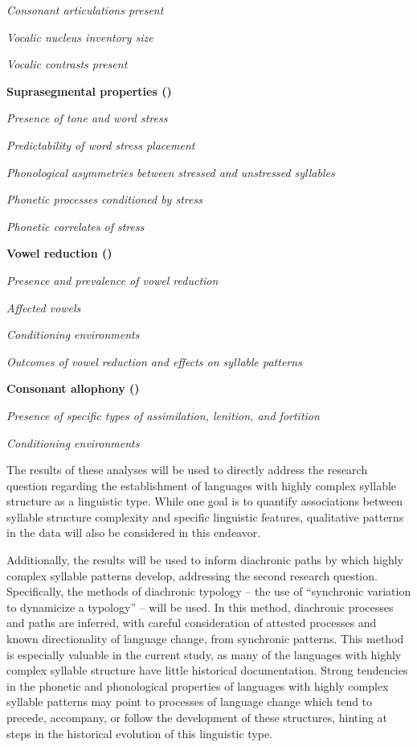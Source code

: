\textit{Consonant articulations present}

\textit{Vocalic nucleus inventory size}

\textit{Vocalic contrasts present}

\textbf{Suprasegmental properties ()}

\textit{Presence of tone and word stress}

\textit{Predictability of word stress placement}

\textit{Phonological asymmetries between stressed and unstressed syllables}

\textit{Phonetic processes conditioned by stress}

\textit{Phonetic correlates of stress}

\textbf{Vowel reduction ()}

\textit{Presence and prevalence of vowel reduction}

\textit{Affected vowels}

\textit{Conditioning environments}

\textit{Outcomes of vowel reduction and effects on syllable patterns}

\textbf{Consonant allophony ()}

\textit{Presence of specific types of assimilation, lenition, and fortition}

\textit{Conditioning environments}
\z

  The results of these analyses will be used to directly address the research question regarding the establishment of languages with highly complex syllable structure as a linguistic type. While one goal is to quantify associations between syllable structure complexity and specific linguistic features, qualitative patterns in the data will also be considered in this endeavor.

  Additionally, the results will be used to inform diachronic paths by which highly complex syllable patterns develop, addressing the second research question. Specifically, the methods of diachronic typology -- the use of “synchronic variation to dynamicize a typology” \citep[272]{Croft2003} -- will be used. In this method, diachronic processes and paths are inferred, with careful consideration of attested processes and known directionality of language change, from synchronic patterns. This method is especially valuable in the current study, as many of the languages with highly complex syllable structure have little historical documentation. Strong tendencies in the phonetic and phonological properties of languages with highly complex syllable patterns may point to processes of language change which tend to precede, accompany, or follow the development of these structures, hinting at steps in the historical evolution of this linguistic type.

